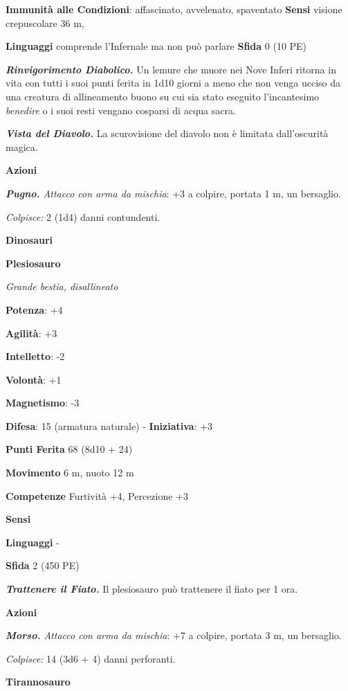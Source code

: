 \begin{multicols}{2}
\textbf{Immunità alle Condizioni}: affascinato, avvelenato, spaventato
\textbf{Sensi} visione crepuscolare 36 m, 

\textbf{Linguaggi} comprende l'Infernale ma non può parlare
\textbf{Sfida} 0 (10 PE)\smallskip

\emph{\textbf{Rinvigorimento Diabolico.}} Un lemure che muore nei Nove
Inferi ritorna in vita con tutti i suoi punti ferita in 1d10 giorni a
meno che non venga ucciso da una creatura di allineamento buono su cui
sia stato eseguito l'incantesimo \emph{benedire} o i suoi resti vengano
cosparsi di acqua sacra.

\emph{\textbf{Vista del Diavolo.}} La scurovisione del diavolo non è
limitata dall'oscurità magica.

\smallskip\textbf{Azioni}

\emph{\textbf{Pugno.} Attacco con arma da mischia}: +3 a colpire,
portata 1 m, un bersaglio.

\emph{Colpisce:} 2 (1d4) danni contundenti.

\textbf{Dinosauri}

\textbf{Plesiosauro}

\emph{Grande bestia, disallineato}

\textbf{Potenza}: +4

\textbf{Agilità}: +3

\textbf{Intelletto}: -2

\textbf{Volontà}: +1

\textbf{Magnetismo}: -3

\textbf{Difesa}: 15 (armatura naturale) - \textbf{Iniziativa}: +3

\textbf{Punti Ferita} 68 (8d10 + 24)

\textbf{Movimento} 6 m, nuoto 12 m

\textbf{Competenze} Furtività +4, Percezione +3

\textbf{Sensi} 

\textbf{Linguaggi} -

\textbf{Sfida} 2 (450 PE)\smallskip

\emph{\textbf{Trattenere il Fiato.}} Il plesiosauro può trattenere il
fiato per 1 ora.

\smallskip\textbf{Azioni}

\emph{\textbf{Morso.} Attacco con arma da mischia}: +7 a colpire,
portata 3 m, un bersaglio.

\emph{Colpisce:} 14 (3d6 + 4) danni perforanti.

\textbf{Tirannosauro}


\end{multicols}
